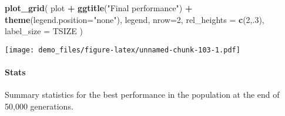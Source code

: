 \documentclass[]{book}
\newenvironment{Shaded}{\begin{snugshade}}{\end{snugshade}}
\newcommand{\DataTypeTok}[1]{\textcolor[rgb]{0.13,0.29,0.53}{#1}}
\newcommand{\DecValTok}[1]{\textcolor[rgb]{0.00,0.00,0.81}{#1}}
\newcommand{\KeywordTok}[1]{\textcolor[rgb]{0.13,0.29,0.53}{\textbf{#1}}}
\newcommand{\NormalTok}[1]{#1}
\newcommand{\OperatorTok}[1]{\textcolor[rgb]{0.81,0.36,0.00}{\textbf{#1}}}
\newcommand{\OtherTok}[1]{\textcolor[rgb]{0.56,0.35,0.01}{#1}}
\newcommand{\StringTok}[1]{\textcolor[rgb]{0.31,0.60,0.02}{#1}}
\let\oldparagraph\paragraph
\renewcommand{\paragraph}[1]{\oldparagraph{#1}\mbox{}}
\begin{document}
\begin{Shaded}
\begin{Highlighting}[]
\KeywordTok{plot_grid}\NormalTok{(}
\NormalTok{  plot }\OperatorTok{+}
\StringTok{    }\KeywordTok{ggtitle}\NormalTok{(}\StringTok{"Final performance"}\NormalTok{) }\OperatorTok{+}
\StringTok{    }\KeywordTok{theme}\NormalTok{(}\DataTypeTok{legend.position=}\StringTok{"none"}\NormalTok{),}
\NormalTok{  legend,}
  \DataTypeTok{nrow=}\DecValTok{2}\NormalTok{,}
  \DataTypeTok{rel_heights =} \KeywordTok{c}\NormalTok{(}\DecValTok{2}\NormalTok{,.}\DecValTok{3}\NormalTok{),}
  \DataTypeTok{label_size =}\NormalTok{ TSIZE}
\NormalTok{)}
\end{Highlighting}
\end{Shaded}

\texttt{[image: demo\_files/figure-latex/unnamed-chunk-103-1.pdf]}

\hypertarget{stats-19}{%
\paragraph{Stats}\label{stats-19}}

Summary statistics for the best performance in the population at the end of 50,000 generations.

\begin{Shaded}
\end{Shaded}
\end{document}
